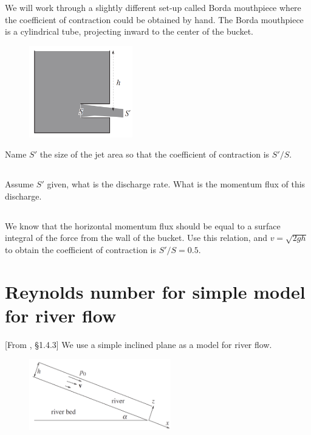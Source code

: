 \documentclass[11pt,letterpaper]{report}
\begin{document}
We will work through a slightly different set-up called Borda mouthpiece where the coefficient of contraction could be obtained by hand. The Borda mouthpiece is a cylindrical tube, projecting inward to the center of the bucket.
\begin{figure}[H]
    \centering
    \includegraphics[width=0.4\textwidth]{Session_5/figs/borda}
\end{figure}
Name $S'$ the size of the jet area so that the coefficient of contraction is $S'/S$. 

\subsection{}
Assume $S'$ given, what is the discharge rate. What is the momentum flux of this discharge.

\subsection{}
We know that the horizontal momentum flux should be equal to a surface integral of the force from the wall of the bucket. Use this relation, and $v=\sqrt{2gh}$ to obtain the coefficient of contraction is $S'/S = 0.5$.

\section{Reynolds number for simple model for river flow}
[From \cite{Falkovich_18}, \S 1.4.3] 
We use a simple inclined plane as a model for river flow.
\begin{figure}[H]
    \centering
    \includegraphics[width=0.55\textwidth]{Session_6/figs/incline_river}
\end{figure}
\end{document}
